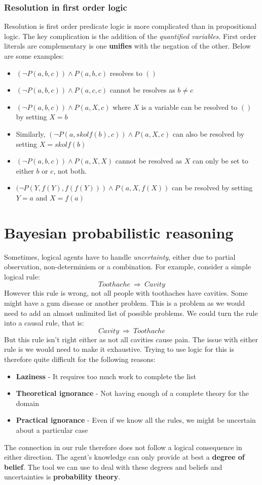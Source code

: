 \documentclass{article}
\begin{document}
\subsubsection{Resolution in first order logic}
Resolution is first order predicate logic is more complicated than in propositional logic. The key complication is the addition of the \textit{quantified variables}. First order literals are complementary is one \textbf{unifies} with the negation of the other. Below are some examples:
\begin{itemize}
\item $(\neg P(a, b, c)) \wedge P(a, b, c)$ resolves to $()$
\item $(\neg P(a, b, c)) \wedge P(a, c, c)$ cannot be resolves as $b \neq c$
\item $(\neg P(a, b, c)) \wedge P(a, X, c)$ where $X$ is a variable can be resolved to $()$ by setting $X = b$
\item Similarly, $(\neg P(a, skolf(b), c)) \wedge P(a, X, c)$ can also be resolved by setting $X = skolf(b)$
\item $(\neg P(a, b, c)) \wedge P(a, X, X)$ cannot be resolved as $X$ can only be set to either $b$ or $c$, not both.
\item $(\neg P(Y, f(Y), f(f(Y))) \wedge P(a, X, f(X))$ can be resolved by setting $Y = a$ and $X = f(a)$
\end{itemize}
\section{Bayesian probabilistic reasoning}
Sometimes, logical agents have to handle \textit{uncertainty}, either due to partial observation, non-determinism or a combination. For example, consider a simple logical rule:
\begin{equation}
Toothache\ \Rightarrow\ Cavity
\end{equation}
However this rule is wrong, not all people with toothaches have cavities. Some might have a gum disease or another problem. This is a problem as we would need to add an almost unlimited list of possible problems. We could  turn the rule into a causal rule, that is:
\begin{equation}
Cavity\ \Rightarrow\ Toothache
\end{equation}
But this rule isn't right either as not all cavities cause pain. The issue with either rule is we would need to make it exhaustive. Trying to use logic for this is therefore quite difficult for the following reasons:
\begin{itemize}
\item \textbf{Laziness} - It requires too much work to complete the list
\item \textbf{Theoretical ignorance} - Not having enough of a complete theory for the domain
\item \textbf{Practical ignorance} - Even if we know all the rules, we might be uncertain about a particular case
\end{itemize}
The connection in our rule therefore does not follow a logical consequence in either direction. The agent's knowledge can only provide at best a \textbf{degree of belief}. The tool we can use to deal with these degrees and beliefs and uncertainties is \textbf{probability theory}.
\end{document}
